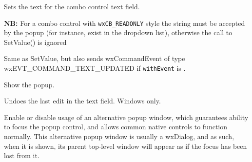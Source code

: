 \label{wxcomboctrlsetvalue}


Sets the text for the combo control text field.

{\bf NB:} For a combo control with {\tt wxCB\_READONLY} style the
string must be accepted by the popup (for instance, exist in the dropdown
list), otherwise the call to SetValue() is ignored


\label{wxcomboctrlsetvaluewithevent}


Same as SetValue, but also sends wxCommandEvent of type wxEVT\_COMMAND\_TEXT\_UPDATED
if {\tt withEvent} is \true.


\label{wxcomboctrlshowpopup}


Show the popup.


\label{wxcomboctrlundo}


Undoes the last edit in the text field. Windows only.


\label{wxcomboctrlusealtpopupwindow}


Enable or disable usage of an alternative popup window, which guarantees
ability to focus the popup control, and allows common native controls to
function normally. This alternative popup window is usually a wxDialog,
and as such, when it is shown, its parent top-level window will appear
as if the focus has been lost from it.


